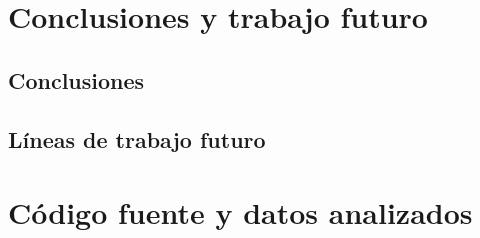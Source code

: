 \documentclass[11pt,a4paper,spanish]{book}
\numberwithin{equation}{chapter}
\numberwithin{figure}{chapter}
\numberwithin{table}{chapter}
\begin{document}
\chapter{Conclusiones y trabajo futuro}

\section{Conclusiones}
%
%

\section{Líneas de trabajo futuro}






\appendix
\chapter{Código fuente y datos analizados}
\end{document}
